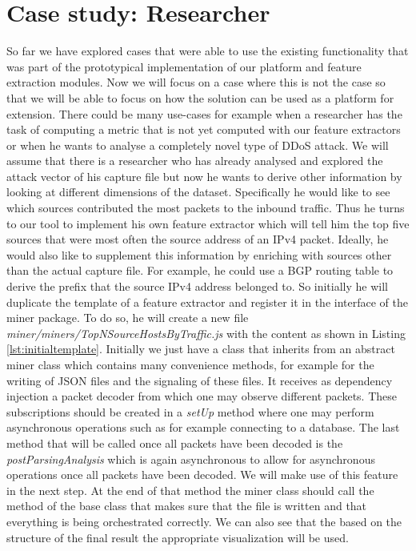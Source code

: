 \section{Case study: Researcher}
So far we have explored cases that were able to use the existing functionality that was part of the prototypical implementation of our platform and feature extraction modules. Now we will focus on a case where this is not the case so that we will be able to focus on how the solution can be used as a platform for extension.
There could be many use-cases for example when a researcher has the task of computing a metric that is not yet computed with our feature extractors or when he wants to analyse a completely novel type of DDoS attack. We will assume that there is a researcher who has already analysed and explored the attack vector of his capture file but now he wants to derive other information by looking at different dimensions of the dataset. Specifically he would like to see which sources contributed the most packets to the inbound traffic. Thus he turns to our tool to implement his own feature extractor which will tell him the top five sources that were most often the source address of an IPv4 packet. Ideally, he would also like to supplement this information by enriching with sources other than the actual capture file. For example, he could use a BGP routing table to derive the prefix that the source IPv4 address belonged to.
So initially he will duplicate the template of a feature extractor and register it in the interface of the miner package. To do so, he will create a new file \textit{miner/miners/TopNSourceHostsByTraffic.js} with the content as shown in Listing \ref{lst:initialtemplate}.
Initially we just have a class that inherits from an abstract miner class which contains many convenience methods, for example for the writing of JSON files and the signaling of these files. It receives as dependency injection a packet decoder from which one may observe different packets. These subscriptions should be created in a \textit{setUp} method where one may perform asynchronous operations such as for example connecting to a database. The last method that will be called once all packets have been decoded is the \textit{postParsingAnalysis} which is again asynchronous to allow for asynchronous operations once all packets have been decoded. We will make use of this feature in the next step. At the end of that method the miner class should call the method of the base class that makes sure that the file is written and that everything is being orchestrated correctly. We can also see that the based on the structure of the final result the appropriate visualization will be used.


